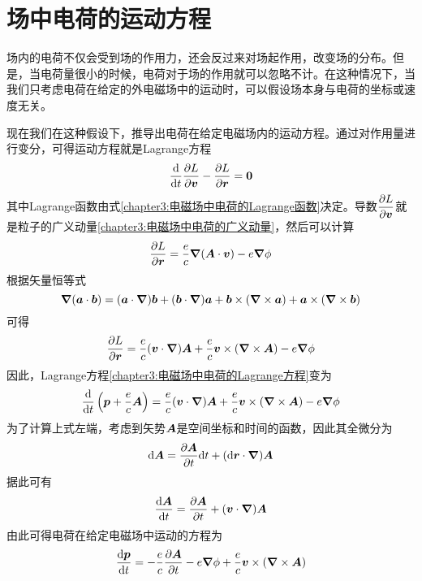 \section{场中电荷的运动方程}\label{chapter3:section:场中电荷的运动方程}

场内的电荷不仅会受到场的作用力，还会反过来对场起作用，改变场的分布。但是，当电荷量很小的时候，电荷对于场的作用就可以忽略不计。在这种情况下，当我们只考虑电荷在给定的外电磁场中的运动时，可以假设场本身与电荷的坐标或速度无关。

现在我们在这种假设下，推导出电荷在给定电磁场内的运动方程。通过对作用量进行变分，可得运动方程就是Lagrange方程
\begin{equation}
	\frac{\mathrm{d}}{\mathrm{d} t} \frac{\partial L}{\partial \boldsymbol{v}} - \frac{\partial L}{\partial \boldsymbol{r}} = \boldsymbol{0}
	\label{chapter3:电磁场中电荷的Lagrange方程}
\end{equation}
其中Lagrange函数由式\eqref{chapter3:电磁场中电荷的Lagrange函数}决定。导数$\dfrac{\partial L}{\partial \boldsymbol{v}}$就是粒子的广义动量\eqref{chapter3:电磁场中电荷的广义动量}，然后可以计算
\begin{equation*}
	\frac{\partial L}{\partial \boldsymbol{r}} = \dfrac{e}{c}\boldsymbol{\nabla} (\boldsymbol{A}\cdot \boldsymbol{v}) - e\boldsymbol{\nabla} \phi
\end{equation*}
根据矢量恒等式
\begin{equation*}
	\boldsymbol{\nabla} (\boldsymbol{a}\cdot \boldsymbol{b}) = (\boldsymbol{a}\cdot \boldsymbol{\nabla})\boldsymbol{b} + (\boldsymbol{b}\cdot \boldsymbol{\nabla})\boldsymbol{a} + \boldsymbol{b}\times (\boldsymbol{\nabla} \times \boldsymbol{a}) + \boldsymbol{a}\times (\boldsymbol{\nabla} \times \boldsymbol{b})
\end{equation*}
可得
\begin{equation*}
	\frac{\partial L}{\partial \boldsymbol{r}} = \dfrac{e}{c}(\boldsymbol{v}\cdot \boldsymbol{\nabla})\boldsymbol{A} + \dfrac{e}{c}\boldsymbol{v}\times (\boldsymbol{\nabla} \times \boldsymbol{A}) - e\boldsymbol{\nabla} \phi
\end{equation*}
因此，Lagrange方程\eqref{chapter3:电磁场中电荷的Lagrange方程}变为
\begin{equation*}
	\frac{\mathrm{d}}{\mathrm{d} t}\left(\boldsymbol{p}+\dfrac{e}{c}\boldsymbol{A}\right) = \dfrac{e}{c}(\boldsymbol{v}\cdot \boldsymbol{\nabla})\boldsymbol{A} + \dfrac{e}{c}\boldsymbol{v}\times (\boldsymbol{\nabla} \times \boldsymbol{A}) - e\boldsymbol{\nabla} \phi
\end{equation*}
为了计算上式左端，考虑到矢势$\boldsymbol{A}$是空间坐标和时间的函数，因此其全微分为
\begin{equation*}
	\mathrm{d} \boldsymbol{A} = \frac{\partial \boldsymbol{A}}{\partial t}\mathrm{d} t + (\mathrm{d} \boldsymbol{r}\cdot \boldsymbol{\nabla}) \boldsymbol{A}
\end{equation*}
据此可有
\begin{equation*}
	\frac{\mathrm{d} \boldsymbol{A}}{\mathrm{d} t} = \frac{\partial \boldsymbol{A}}{\partial t} + (\boldsymbol{v}\cdot \boldsymbol{\nabla})\boldsymbol{A}
\end{equation*}
由此可得电荷在给定电磁场中运动的方程为
\begin{equation}
	\frac{\mathrm{d} \boldsymbol{p}}{\mathrm{d} t} = -\dfrac{e}{c}\frac{\partial \boldsymbol{A}}{\partial t} - e\boldsymbol{\nabla} \phi + \dfrac{e}{c}\boldsymbol{v}\times (\boldsymbol{\nabla} \times \boldsymbol{A})
	\label{chapter3:电荷在给定电磁场中的运动方程}
\end{equation}

